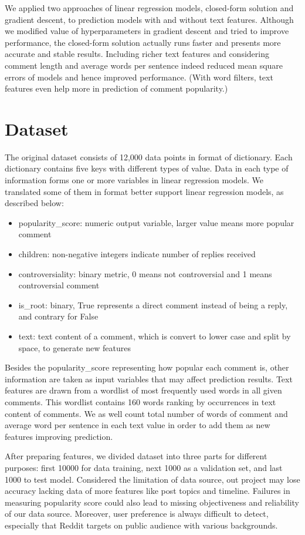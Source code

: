 \documentclass[letterpaper, 11pt]{article}
\begin{document}
We applied two approaches of linear regression models, closed-form solution and gradient descent, to prediction models with and without text features. Although we modified value of hyperparameters in gradient descent and tried to improve performance, the closed-form solution actually runs faster and presents more accurate and stable results. Including richer text features and considering comment length and average words per sentence indeed reduced mean square errors of models and hence improved performance. (With word filters, text features even help more in prediction of comment popularity.)


\section*{Dataset}
The original dataset consists of 12,000 data points in format of dictionary. Each dictionary contains five keys with different types of value. Data in each type of information forms one or more variables in linear regression models. We translated some of them in format better support linear regression models, as described below:

\begin{itemize}
    \item popularity\_score: numeric output variable, larger value means more popular comment
    \item children: non-negative integers indicate number of replies received
    \item controversiality: binary metric, 0 means not controversial and 1 means controversial comment
    \item is\_root: binary, True represents a direct comment instead of being a reply, and contrary for False
    \item text: text content of a comment, which is convert to lower case and split by space, to generate new features
\end{itemize}

Besides the popularity\_score representing how popular each comment is, other information are taken as input variables that may affect prediction results. Text features are drawn from a wordlist of most frequently used words in all given comments. This wordlist contains 160 words ranking by occurrences in text content of comments. We as well count total number of words of comment and average word per sentence in each text value in order to add them as new features improving prediction.

After preparing features, we divided dataset into three parts for different purposes: first 10000 for data training, next 1000 as a validation set, and last 1000 to test model. Considered the limitation of data source, out project may lose accuracy lacking data of more features like post topics and timeline. Failures in measuring popularity score could also lead to missing objectiveness and reliability of our data source. Moreover, user preference is always difficult to detect, especially that Reddit targets on public audience with various backgrounds.
\end{document}
